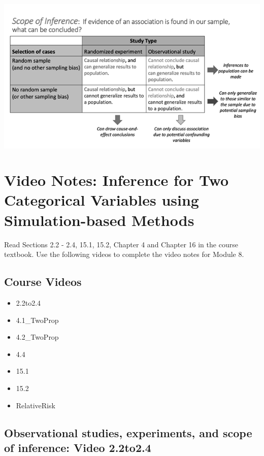 \documentclass[
]{report}
\begin{document}
\begin{center}\includegraphics[width=0.65\linewidth]{images/ScopeOfInferenceGreyscale} \end{center}

\newpage

\section{Video Notes: Inference for Two Categorical Variables using Simulation-based Methods}\label{video-notes-inference-for-two-categorical-variables-using-simulation-based-methods}

Read Sections 2.2 - 2.4, 15.1, 15.2, Chapter 4 and Chapter 16 in the course textbook. Use the following videos to complete the video notes for Module 8.

\subsection{Course Videos}\label{course-videos-6}

\begin{itemize}
\item
  2.2to2.4
\item
  4.1\_TwoProp
\item
  4.2\_TwoProp
\item
  4.4
\item
  15.1
\item
  15.2
\item
  RelativeRisk
\end{itemize}

\subsection*{Observational studies, experiments, and scope of inference: Video 2.2to2.4}\label{observational-studies-experiments-and-scope-of-inference-video-2.2to2.4}
\end{document}
